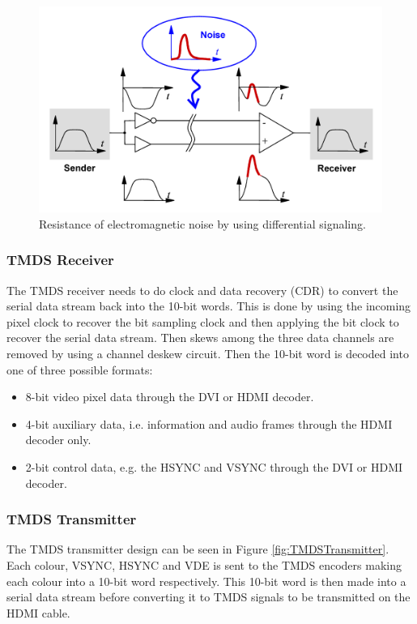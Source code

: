 \begin{figure}[h]
    \centering
    \includegraphics{img/DiffSignaling.png}
    \caption[Resistance of electromagnetic noise by using differential signaling]{
        Resistance of electromagnetic noise by using differential signaling\cite{wikids}.
    }
    \label{fig:differential_signal}
\end{figure}

\subsubsection{TMDS Receiver}
The TMDS receiver needs to do clock and data recovery (CDR) to convert the serial data stream back into the 10-bit words.
This is done by using the incoming pixel clock to recover the bit sampling clock and then applying the bit clock to recover the serial data stream.
Then skews among the three data channels are removed by using a channel deskew circuit.
Then the 10-bit word is decoded into one of three possible formats:
\begin{itemize}
    \item   8-bit video pixel data through the DVI or HDMI decoder.
    \item   4-bit auxiliary data, i.e. information and audio frames through the HDMI decoder only.
    \item   2-bit control data, e.g. the HSYNC and VSYNC through the DVI or HDMI decoder.
\end{itemize}

\subsubsection{TMDS Transmitter}
The TMDS transmitter design can be seen in Figure \ref{fig:TMDSTransmitter}.
Each colour, VSYNC, HSYNC and VDE is sent to the TMDS encoders making each colour into a 10-bit word respectively. This 10-bit word is then made into a serial data stream before converting it to TMDS signals to be transmitted on the HDMI cable.

